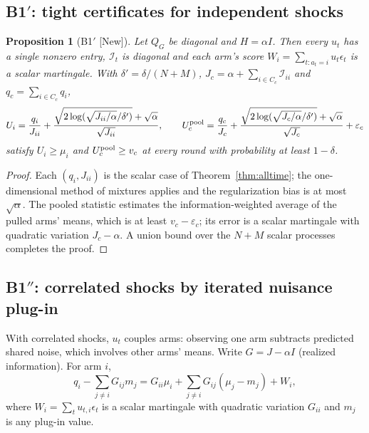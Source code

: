 \documentclass[11pt]{article}
\newtheorem{proposition}[theorem]{Proposition}
\theoremstyle{definition}
\theoremstyle{remark}
\newcommand{\I}{\mathcal{I}}
\newcommand{\src}[1]{\textsf{[#1]}}
\begin{document}
\subsection{B1$'$: tight certificates for independent shocks}

\begin{proposition}[B1$'$ \src{New}]\label{prop:b1p}
Let $Q_G$ be diagonal and $H=\alpha I$. Then every $u_t$ has a single nonzero entry, $\I_t$ is diagonal and each arm's score $W_i=\sum_{t:a_t=i}u_t\epsilon_t$ is a scalar martingale. With $\delta'=\delta/(N+M)$, $J_c=\alpha+\sum_{i\in C_c}\I_{ii}$ and $q_c=\sum_{i\in C_c}q_i$,
\[
U_i=\frac{q_i}{J_{ii}}+\frac{\sqrt{2\log(\sqrt{J_{ii}/\alpha}/\delta')}+\sqrt\alpha}{\sqrt{J_{ii}}},\qquad
U^{\rm pool}_c=\frac{q_c}{J_c}+\frac{\sqrt{2\log(\sqrt{J_c/\alpha}/\delta')}+\sqrt\alpha}{\sqrt{J_c}}+\varepsilon_c
\]
satisfy $U_i\ge\mu_i$ and $U_c^{\rm pool}\ge v_c$ at every round with probability at least $1-\delta$.
\end{proposition}
\begin{proof}
Each $(q_i,J_{ii})$ is the scalar case of Theorem~\ref{thm:alltime}; the one-dimensional method of mixtures applies and the regularization bias is at most $\sqrt\alpha$. The pooled statistic estimates the information-weighted average of the pulled arms' means, which is at least $v_c-\varepsilon_c$; its error is a scalar martingale with quadratic variation $J_c-\alpha$. A union bound over the $N+M$ scalar processes completes the proof.
\end{proof}

\subsection{B1$''$: correlated shocks by iterated nuisance plug-in}

With correlated shocks, $u_t$ couples arms: observing one arm subtracts predicted shared noise, which involves other arms' means. Write $G=J-\alpha I$ (realized information). For arm $i$,
\[
q_i-\sum_{j\ne i}G_{ij}m_j=G_{ii}\mu_i+\sum_{j\ne i}G_{ij}(\mu_j-m_j)+W_i,
\]
where $W_i=\sum_t u_{t,i}\epsilon_t$ is a scalar martingale with quadratic variation $G_{ii}$ and $m_j$ is any plug-in value.
\end{document}
